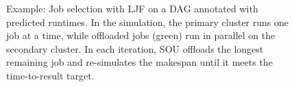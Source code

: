 \begin{figure}[t]
\caption{Example: Job selection with LJF on a DAG annotated with predicted runtimes. In the simulation, the primary cluster runs one job at a time, while offloaded jobs (green) run in parallel on the secondary cluster. In each iteration, SOU offloads the longest remaining job and re-simulates the makespan until it meets the time-to-result target.}
\label{fig:approach}
\end{figure}
